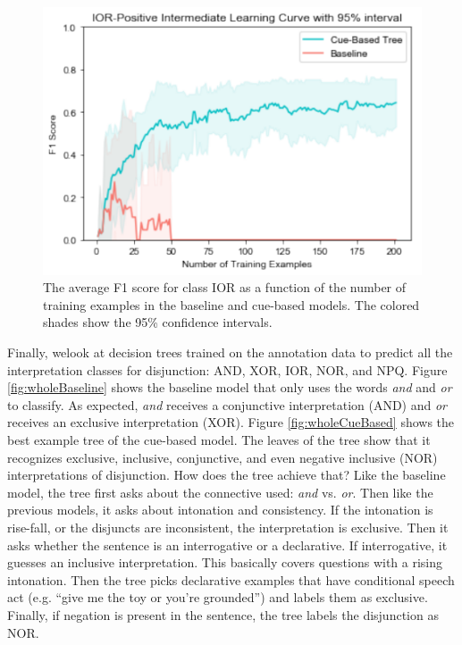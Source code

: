 \documentclass[,man,floatsintext]{apa6}
\begin{document}
\begin{figure}
\centering
\includegraphics{figs/IORintermediate-1.pdf}
\caption{\label{fig:IORintermediate}The average F1 score for class IOR as a function of the number of training examples in the baseline and cue-based models. The colored shades show the 95\% confidence intervals.}
\end{figure}

Finally, welook at decision trees trained on the annotation data to predict all the interpretation classes for disjunction: AND, XOR, IOR, NOR, and NPQ. Figure \ref{fig:wholeBaseline} shows the baseline model that only uses the words \emph{and} and \emph{or} to classify. As expected, \emph{and} receives a conjunctive interpretation (AND) and \emph{or} receives an exclusive interpretation (XOR). Figure \ref{fig:wholeCueBased} shows the best example tree of the cue-based model. The leaves of the tree show that it recognizes exclusive, inclusive, conjunctive, and even negative inclusive (NOR) interpretations of disjunction. How does the tree achieve that? Like the baseline model, the tree first asks about the connective used: \emph{and} vs. \emph{or}. Then like the previous models, it asks about intonation and consistency. If the intonation is rise-fall, or the disjuncts are inconsistent, the interpretation is exclusive. Then it asks whether the sentence is an interrogative or a declarative. If interrogative, it guesses an inclusive interpretation. This basically covers questions with a rising intonation. Then the tree picks declarative examples that have conditional speech act (e.g. \enquote{give me the toy or you're grounded}) and labels them as exclusive. Finally, if negation is present in the sentence, the tree labels the disjunction as NOR.
\end{document}
